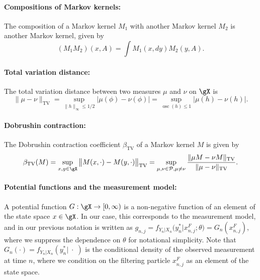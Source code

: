 \paragraph{\bf Compositions of Markov kernels:} The composition of a Markov kernel $M_1$ with another Markov kernel $M_2$ is another Markov kernel, given by 
\begin{equation}
 (M_1M_2)(x, A) = \int M_1(x, dy) M_2(y, A).
\end{equation}

\paragraph{\bf Total variation distance:} The total variation distance between two measures $\mu$ and $\nu$ on $\gX$ is
\begin{equation}
\|\mu-\nu\|_{\mathrm{TV}}=\sup _{\|h\|_{\infty} \leq 1 / 2}|\mu(\phi)-\nu(\phi)|=\sup _{\operatorname{osc}(h) \leq 1}|\mu(h)-\nu(h)|.    
\end{equation}

\paragraph{\bf Dobrushin contraction:} The Dobrushin contraction coefficient $\beta_{\text{TV}}$ of a Markov kernel $M$ is given by
\begin{equation}
\beta_{\mathrm{TV}}(M)=\sup _{x, y \in \gX}\big\|M(x, \cdot)-M(y, \cdot)\big\|_{\mathrm{TV}}=\sup _{\mu, \nu \in \mathcal{P}, \mu \neq \nu} \frac{\|\mu M-\nu M\|_{\mathrm{TV}}}{\|\mu-\nu\|_{\mathrm{TV}}}.    
\end{equation}

\paragraph{\bf Potential functions and the measurement model:} A potential function $G : \gX \to [0,\infty)$ is a non-negative function of an element of the state space $x \in \gX$. 
In our case, this corresponds to the measurement model, and in our previous notation is written as $g_{n,j} = f_{Y_n|X_n}\big(y_n^*|x_{n,j}^F;\theta\big) = G_n(x_{n,j}^F)$, where we suppress the dependence on $\theta$ for notational simplicity. 
Note that $G_n(\cdot) = f_{Y_n|X_n}(y_n^*|\;\cdot\;)$ is the conditional density of the observed measurement at time $n$, where we condition on the filtering particle $x_{n,j}^F$ as an element of the state space. 

